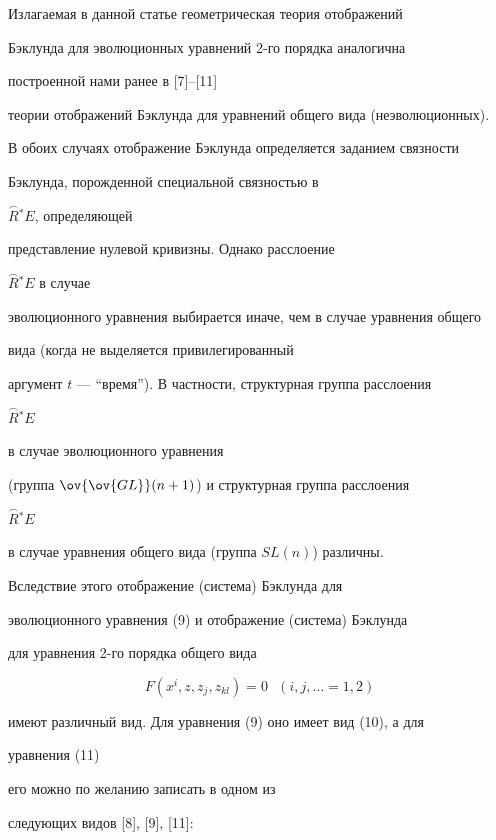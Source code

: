 \begin{notes}


Излагаемая в данной статье геометрическая теория отображений


Бэклунда для эволюционных уравнений 2-го порядка аналогична 


построенной нами ранее в [7]--[11]


теории отображений Бэклунда для уравнений общего вида (неэволюционных).


В обоих случаях отображение Бэклунда определяется заданием связности 


Бэклунда, порожденной специальной связностью в


$\overset{\frown}{R}{}^*E$, определяющей 


представление нулевой кривизны. Однако расслоение


$\overset{\frown}{R}{}^*E$ в случае


эволюционного уравнения выбирается иначе, чем в случае уравнения общего 


вида (когда не выделяется привилегированный


аргумент $t$ --- ``время''). В частности, структурная группа расслоения


$\overset{\frown}{R}{}^*E$


в случае эволюционного уравнения


(группа $\ov{\ov {GL}} ({n+1}) $) и структурная группа расслоения


$\overset{\frown}{R}{}^*E$


в случае уравнения общего вида (группа $SL (n)$) различны. 


Вследствие этого отображение (система) Бэклунда для


эволюционного уравнения {(9)} и отображение (система) Бэклунда 


для уравнения 2-го порядка общего вида 


\begin{equation}


F ({x^i,z,z_j,z_{kl}})=0~~~ ({i,j, \dotsc=1,2})


\end{equation}


имеют различный вид. Для уравнения {(9)} оно имеет вид {(10)}, а для 


уравнения {(11)}


его можно по желанию записать в одном из


следующих видов {[8], [9], [11]}:


\begin{gather*}



\end{gather*}
\end{notes}
